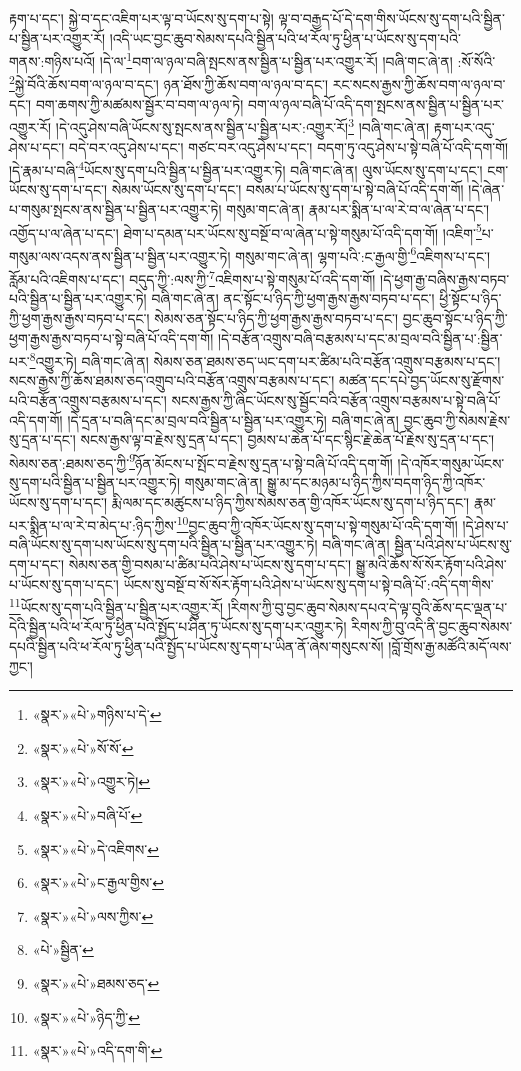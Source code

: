 རྟག་པ་དང་། སྐྱེ་བ་དང་འཇིག་པར་ལྟ་བ་ཡོངས་སུ་དག་པ་སྟེ། ལྟ་བ་བརྒྱད་པོ་དེ་དག་གིས་ཡོངས་སུ་དག་པའི་སྦྱིན་པ་སྦྱིན་པར་འགྱུར་རོ། །འདི་ཡང་བྱང་ཆུབ་སེམས་དཔའི་སྦྱིན་པའི་ཕ་རོལ་ཏུ་ཕྱིན་པ་ཡོངས་སུ་དག་པའི་གནས་:གཉིས་པའོ། །དེ་ལ་\footnote{«སྣར་»«པེ་»གཉིས་པ་དེ་}བག་ལ་ཉལ་བཞི་སྤངས་ནས་སྦྱིན་པ་སྦྱིན་པར་འགྱུར་རོ། །བཞི་གང་ཞེ་ན། :སོ་སོའི་\footnote{«སྣར་»«པེ་»སོ་སོ་}སྐྱེ་བོའི་ཆོས་བག་ལ་ཉལ་བ་དང་། ཉན་ཐོས་ཀྱི་ཆོས་བག་ལ་ཉལ་བ་དང་། རང་སངས་རྒྱས་ཀྱི་ཆོས་བག་ལ་ཉལ་བ་དང་། བག་ཆགས་ཀྱི་མཚམས་སྦྱོར་བ་བག་ལ་ཉལ་ཏེ། བག་ལ་ཉལ་བཞི་པོ་འདི་དག་སྤངས་ནས་སྦྱིན་པ་སྦྱིན་པར་འགྱུར་རོ། །དེ་འདུ་ཤེས་བཞི་ཡོངས་སུ་སྤངས་ནས་སྦྱིན་པ་སྦྱིན་པར་:འགྱུར་རོ།\footnote{«སྣར་»«པེ་»འགྱུར་ཏེ།} །བཞི་གང་ཞེ་ན། རྟག་པར་འདུ་ཤེས་པ་དང་། བདེ་བར་འདུ་ཤེས་པ་དང་། གཙང་བར་འདུ་ཤེས་པ་དང་། བདག་ཏུ་འདུ་ཤེས་པ་སྟེ་བཞི་པོ་འདི་དག་གོ། །དེ་རྣམ་པ་བཞི་\footnote{«སྣར་»«པེ་»བཞི་པོ་}ཡོངས་སུ་དག་པའི་སྦྱིན་པ་སྦྱིན་པར་འགྱུར་ཏེ། བཞི་གང་ཞེ་ན། ལུས་ཡོངས་སུ་དག་པ་དང་། ངག་ཡོངས་སུ་དག་པ་དང་། སེམས་ཡོངས་སུ་དག་པ་དང་། བསམ་པ་ཡོངས་སུ་དག་པ་སྟེ་བཞི་པོ་འདི་དག་གོ། །དེ་ཞེན་པ་གསུམ་སྤངས་ནས་སྦྱིན་པ་སྦྱིན་པར་འགྱུར་ཏེ། གསུམ་གང་ཞེ་ན། རྣམ་པར་སྨིན་པ་ལ་རེ་བ་ལ་ཞེན་པ་དང་། འགྱོད་པ་ལ་ཞེན་པ་དང་། ཐེག་པ་དམན་པར་ཡོངས་སུ་བསྔོ་བ་ལ་ཞེན་པ་སྟེ་གསུམ་པོ་འདི་དག་གོ། །འཇིག་\footnote{«སྣར་»«པེ་»དེ་འཇིགས་}པ་གསུམ་ལས་འདས་ནས་སྦྱིན་པ་སྦྱིན་པར་འགྱུར་ཏེ། གསུམ་གང་ཞེ་ན། ལྷག་པའི་:ང་རྒྱལ་གྱི་\footnote{«སྣར་»«པེ་»ང་རྒྱལ་གྱིས་}འཇིགས་པ་དང་། རློམ་པའི་འཇིགས་པ་དང་། བདུད་ཀྱི་:ལས་ཀྱི་\footnote{«སྣར་»«པེ་»ལས་ཀྱིས་}འཇིགས་པ་སྟེ་གསུམ་པོ་འདི་དག་གོ། །དེ་ཕྱག་རྒྱ་བཞིས་རྒྱས་བཏབ་པའི་སྦྱིན་པ་སྦྱིན་པར་འགྱུར་ཏེ། བཞི་གང་ཞེ་ན། ནང་སྟོང་པ་ཉིད་ཀྱི་ཕྱག་རྒྱས་རྒྱས་བཏབ་པ་དང་། ཕྱི་སྟོང་པ་ཉིད་ཀྱི་ཕྱག་རྒྱས་རྒྱས་བཏབ་པ་དང་། སེམས་ཅན་སྟོང་པ་ཉིད་ཀྱི་ཕྱག་རྒྱས་རྒྱས་བཏབ་པ་དང་། བྱང་ཆུབ་སྟོང་པ་ཉིད་ཀྱི་ཕྱག་རྒྱས་རྒྱས་བཏབ་པ་སྟེ་བཞི་པོ་འདི་དག་གོ། །དེ་བརྩོན་འགྲུས་བཞི་བརྩམས་པ་དང་མ་བྲལ་བའི་སྦྱིན་པ་:སྦྱིན་པར་\footnote{«པེ་»སྦྱིན་}འགྱུར་ཏེ། བཞི་གང་ཞེ་ན། སེམས་ཅན་ཐམས་ཅད་ཡང་དག་པར་ཚིམ་པའི་བརྩོན་འགྲུས་བརྩམས་པ་དང་། སངས་རྒྱས་ཀྱི་ཆོས་ཐམས་ཅད་འགྲུབ་པའི་བརྩོན་འགྲུས་བརྩམས་པ་དང་། མཚན་དང་དཔེ་བྱད་ཡོངས་སུ་རྫོགས་པའི་བརྩོན་འགྲུས་བརྩམས་པ་དང་། སངས་རྒྱས་ཀྱི་ཞིང་ཡོངས་སུ་སྦྱོང་བའི་བརྩོན་འགྲུས་བརྩམས་པ་སྟེ་བཞི་པོ་འདི་དག་གོ། །དེ་དྲན་པ་བཞི་དང་མ་བྲལ་བའི་སྦྱིན་པ་སྦྱིན་པར་འགྱུར་ཏེ། བཞི་གང་ཞེ་ན། བྱང་ཆུབ་ཀྱི་སེམས་རྗེས་སུ་དྲན་པ་དང་། སངས་རྒྱས་ལྟ་བ་རྗེས་སུ་དྲན་པ་དང་། བྱམས་པ་ཆེན་པོ་དང་སྙིང་རྗེ་ཆེན་པོ་རྗེས་སུ་དྲན་པ་དང་། སེམས་ཅན་:ཐམས་ཅད་ཀྱི་\footnote{«སྣར་»«པེ་»ཐམས་ཅད་}ཉོན་མོངས་པ་སྤོང་བ་རྗེས་སུ་དྲན་པ་སྟེ་བཞི་པོ་འདི་དག་གོ། །དེ་འཁོར་གསུམ་ཡོངས་སུ་དག་པའི་སྦྱིན་པ་སྦྱིན་པར་འགྱུར་ཏེ། གསུམ་གང་ཞེ་ན། སྒྱུ་མ་དང་མཉམ་པ་ཉིད་ཀྱིས་བདག་ཉིད་ཀྱི་འཁོར་ཡོངས་སུ་དག་པ་དང་། རྨི་ལམ་དང་མཚུངས་པ་ཉིད་ཀྱིས་སེམས་ཅན་གྱི་འཁོར་ཡོངས་སུ་དག་པ་ཉིད་དང་། རྣམ་པར་སྨིན་པ་ལ་རེ་བ་མེད་པ་:ཉིད་ཀྱིས་\footnote{«སྣར་»«པེ་»ཉིད་ཀྱི་}བྱང་ཆུབ་ཀྱི་འཁོར་ཡོངས་སུ་དག་པ་སྟེ་གསུམ་པོ་འདི་དག་གོ། །དེ་ཤེས་པ་བཞི་ཡོངས་སུ་དག་པས་ཡོངས་སུ་དག་པའི་སྦྱིན་པ་སྦྱིན་པར་འགྱུར་ཏེ། བཞི་གང་ཞེ་ན། སྦྱིན་པའི་ཤེས་པ་ཡོངས་སུ་དག་པ་དང་། སེམས་ཅན་གྱི་བསམ་པ་ཚིམ་པའི་ཤེས་པ་ཡོངས་སུ་དག་པ་དང་། སྒྱུ་མའི་ཆོས་སོ་སོར་རྟོག་པའི་ཤེས་པ་ཡོངས་སུ་དག་པ་དང་། ཡོངས་སུ་བསྔོ་བ་སོ་སོར་རྟོག་པའི་ཤེས་པ་ཡོངས་སུ་དག་པ་སྟེ་བཞི་པོ་:འདི་དག་གིས་\footnote{«སྣར་»«པེ་»འདི་དག་གི་}ཡོངས་སུ་དག་པའི་སྦྱིན་པ་སྦྱིན་པར་འགྱུར་རོ། །རིགས་ཀྱི་བུ་བྱང་ཆུབ་སེམས་དཔའ་དེ་ལྟ་བུའི་ཆོས་དང་ལྡན་པ་དེའི་སྦྱིན་པའི་ཕ་རོལ་ཏུ་ཕྱིན་པའི་སྤྱོད་པ་ཤིན་ཏུ་ཡོངས་སུ་དག་པར་འགྱུར་ཏེ། རིགས་ཀྱི་བུ་འདི་ནི་བྱང་ཆུབ་སེམས་དཔའི་སྦྱིན་པའི་ཕ་རོལ་ཏུ་ཕྱིན་པའི་སྤྱོད་པ་ཡོངས་སུ་དག་པ་ཡིན་ནོ་ཞེས་གསུངས་སོ། །བློ་གྲོས་རྒྱ་མཚོའི་མདོ་ལས་ཀྱང་། 
